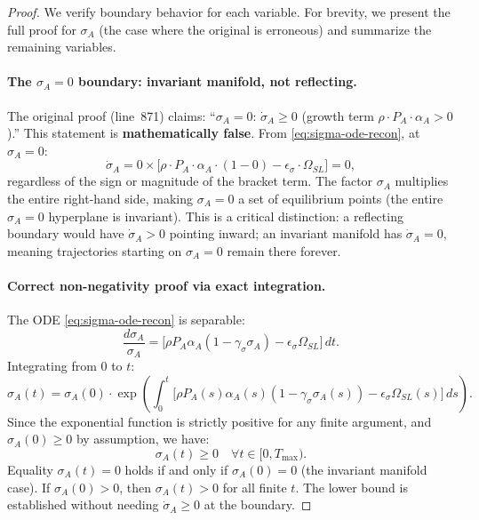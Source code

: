 \begin{proof}
We verify boundary behavior for each variable. For brevity, we present
the full proof for $\sigma_A$ (the case where the original is erroneous)
and summarize the remaining variables.

\paragraph{The $\sigma_A = 0$ boundary: invariant manifold, not reflecting.}
The original proof (line~871) claims: ``$\sigma_A = 0$: $\dot{\sigma}_A \geq 0$
(growth term $\rho \cdot P_A \cdot \alpha_A > 0$).'' This statement is
\textbf{mathematically false}. From \eqref{eq:sigma-ode-recon}, at $\sigma_A = 0$:
\[
\dot{\sigma}_A = 0 \times \bigl[ \rho \cdot P_A \cdot \alpha_A \cdot (1 - 0) - \epsilon_\sigma \cdot \Omega_{SL} \bigr] = 0,
\]
regardless of the sign or magnitude of the bracket term. The factor
$\sigma_A$ multiplies the entire right-hand side, making $\sigma_A = 0$
a set of equilibrium points (the entire $\sigma_A = 0$ hyperplane is
invariant). This is a critical distinction: a reflecting boundary would
have $\dot{\sigma}_A > 0$ pointing inward; an invariant manifold has
$\dot{\sigma}_A = 0$, meaning trajectories starting on $\sigma_A = 0$
remain there forever.

\paragraph{Correct non-negativity proof via exact integration.}
The ODE \eqref{eq:sigma-ode-recon} is separable:
\[
\frac{d\sigma_A}{\sigma_A} = \bigl[ \rho P_A \alpha_A (1 - \gamma_\sigma \sigma_A) - \epsilon_\sigma \Omega_{SL} \bigr] \, dt.
\]
Integrating from $0$ to $t$:
\begin{equation}\label{eq:exact-integral}
\sigma_A(t) = \sigma_A(0) \cdot
\exp\!\left( \int_0^t \bigl[ \rho P_A(s) \alpha_A(s) (1 - \gamma_\sigma \sigma_A(s))
- \epsilon_\sigma \Omega_{SL}(s) \bigr] \, ds \right).
\end{equation}
Since the exponential function is strictly positive for any finite
argument, and $\sigma_A(0) \geq 0$ by assumption, we have:
\[
\sigma_A(t) \geq 0 \quad \forall t \in [0, T_{\max}).
\]
Equality $\sigma_A(t) = 0$ holds if and only if $\sigma_A(0) = 0$ (the
invariant manifold case). If $\sigma_A(0) > 0$, then $\sigma_A(t) > 0$
for all finite $t$. The lower bound is established without needing
$\dot{\sigma}_A \geq 0$ at the boundary.


\end{proof}
